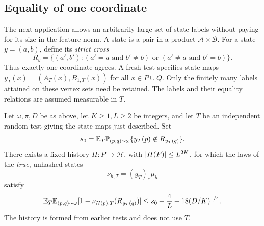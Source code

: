 \subsection{Equality of one coordinate}

The next application allows an arbitrarily large set of state labels without
paying for its size in the feature norm.  A state is a pair in a product
\(\mathcal A\times\mathcal B\).  For a state \(y=(a,b)\), define its
\emph{strict cross}
\begin{equation}\label{pred:strict-cross}
 R_y=\{(a',b'):
           (a'=a\text{ and }b'\ne b)
           \text{ or }(a'\ne a\text{ and }b'=b)\}.
\end{equation}
Thus exactly one coordinate agrees.  A fresh test specifies state maps
\(y_T(x)=(A_T(x),B_{1,T}(x))\) for all \(x\in P\cup Q\).
Only the finitely many labels attained on these vertex sets need be retained.
The labels and their equality relations are assumed measurable in \(T\).

\begin{corollary}\label{pred:cross}
Let \(\omega,\pi,D\) be as above, let \(K\ge1,L\ge2\) be integers, and
let \(T\) be an independent random test giving the state maps just described.
Set
\[
 s_0=\mathbb E_T\mathbb P_{(p,q)\sim\omega}
                       \{y_T(p)\notin R_{y_T(q)}\}.
\]
There exists a fixed history \(H:P\to\mathcal H\), with
\(\lvert H(P)\rvert\le L^{2K}\), for which the laws of the \emph{true}, unhashed
states
\[
 \nu_{h,T}=(y_T)_*\mu_h
\]
satisfy
\begin{equation}\label{pred:cross-bound}
 \mathbb E_T\mathbb E_{(p,q)\sim\omega}
       [1-\nu_{H(p),T}(R_{y_T(q)})]
 \le s_0+\frac4L+18(D/K)^{1/4}.
\end{equation}
The history is formed from earlier tests and does not use \(T\).
\end{corollary}

